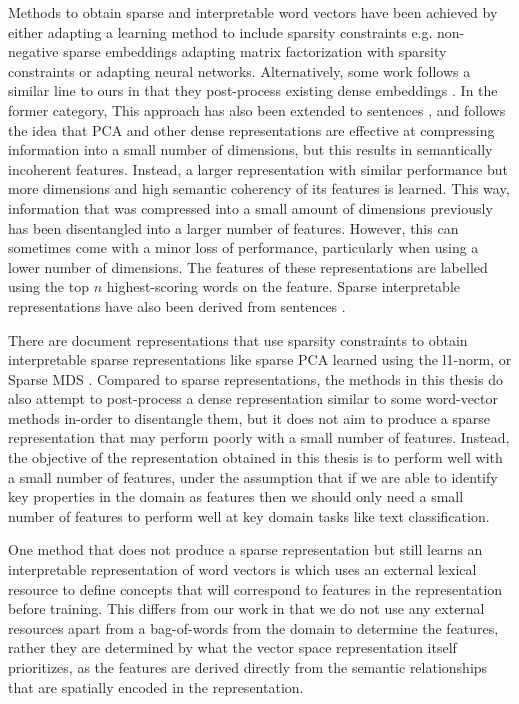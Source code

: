Methods to obtain sparse and interpretable word vectors have been achieved by either adapting a learning method to include sparsity constraints e.g.  non-negative sparse embeddings adapting matrix factorization with  sparsity constraints \cite{Murphya} or \cite{Luo2015} adapting neural networks. Alternatively, some work follows a similar line to ours in that they post-process existing dense embeddings \cite{Subramanian} \cite{Park2017} \cite{Faruqui2015}. In the former category,  This approach has also been extended to sentences \cite{Trifonov2018}, and follows the idea that PCA and other dense representations are effective at compressing information into a small number of dimensions, but this results in semantically incoherent features. Instead, a larger representation with similar performance but more dimensions and high semantic coherency of its features is learned. This way, information that was compressed into a small amount of dimensions previously has been disentangled into a larger number of features.  However, this can sometimes come with a minor loss of performance, particularly when using a lower number of dimensions. The features of these representations are labelled using the top $n$ highest-scoring words on the feature. Sparse interpretable representations have also been derived from sentences \cite{Trifonov}.

There are document representations that use sparsity constraints to obtain interpretable sparse representations like sparse PCA learned using the l1-norm, \cite{H.Zou2006} \cite{Zhang2012} or Sparse MDS \cite{Silva2004}. Compared to sparse representations, the methods in this thesis do also attempt to post-process a dense representation similar to some word-vector methods in-order to disentangle them, but it does not aim to produce a sparse representation that may perform poorly with a small number of features. Instead, the objective of the representation obtained in this thesis is to perform well with a small number of features, under the assumption that if we are able to identify key properties in the domain as features then we should only need a small number of features to perform well at key domain tasks like text classification.  

One method that does not produce a sparse representation but still learns an interpretable representation of word vectors is \cite{Koc} which uses an external lexical resource to define  concepts that will correspond to features in the representation before training. This differs from our work in that we do not use any external resources apart from a bag-of-words from the domain to determine the features, rather they are determined by what the vector space representation itself prioritizes, as the features are derived directly from the semantic relationships that are spatially encoded in the representation. 

